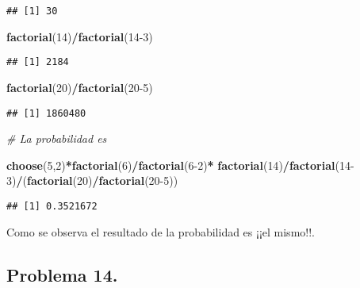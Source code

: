 \documentclass[
]{article}
\newenvironment{Shaded}{\begin{snugshade}}{\end{snugshade}}
\newcommand{\CommentTok}[1]{\textcolor[rgb]{0.56,0.35,0.01}{\textit{#1}}}
\newcommand{\DecValTok}[1]{\textcolor[rgb]{0.00,0.00,0.81}{#1}}
\newcommand{\KeywordTok}[1]{\textcolor[rgb]{0.13,0.29,0.53}{\textbf{#1}}}
\newcommand{\NormalTok}[1]{#1}
\newcommand{\OperatorTok}[1]{\textcolor[rgb]{0.81,0.36,0.00}{\textbf{#1}}}
\newcommand{\StringTok}[1]{\textcolor[rgb]{0.31,0.60,0.02}{#1}}
\begin{document}
\begin{verbatim}
## [1] 30
\end{verbatim}

\begin{Shaded}
\begin{Highlighting}[]
\KeywordTok{factorial}\NormalTok{(}\DecValTok{14}\NormalTok{)}\OperatorTok{/}\KeywordTok{factorial}\NormalTok{(}\DecValTok{14{-}3}\NormalTok{)}
\end{Highlighting}
\end{Shaded}

\begin{verbatim}
## [1] 2184
\end{verbatim}

\begin{Shaded}
\begin{Highlighting}[]
\KeywordTok{factorial}\NormalTok{(}\DecValTok{20}\NormalTok{)}\OperatorTok{/}\KeywordTok{factorial}\NormalTok{(}\DecValTok{20{-}5}\NormalTok{)}
\end{Highlighting}
\end{Shaded}

\begin{verbatim}
## [1] 1860480
\end{verbatim}

\begin{Shaded}
\begin{Highlighting}[]
\CommentTok{\# La probabilidad es }

\KeywordTok{choose}\NormalTok{(}\DecValTok{5}\NormalTok{,}\DecValTok{2}\NormalTok{)}\OperatorTok{*}\KeywordTok{factorial}\NormalTok{(}\DecValTok{6}\NormalTok{)}\OperatorTok{/}\KeywordTok{factorial}\NormalTok{(}\DecValTok{6{-}2}\NormalTok{)}\OperatorTok{*}
\StringTok{  }\KeywordTok{factorial}\NormalTok{(}\DecValTok{14}\NormalTok{)}\OperatorTok{/}\KeywordTok{factorial}\NormalTok{(}\DecValTok{14{-}3}\NormalTok{)}\OperatorTok{/}\NormalTok{(}\KeywordTok{factorial}\NormalTok{(}\DecValTok{20}\NormalTok{)}\OperatorTok{/}\KeywordTok{factorial}\NormalTok{(}\DecValTok{20{-}5}\NormalTok{))}
\end{Highlighting}
\end{Shaded}

\begin{verbatim}
## [1] 0.3521672
\end{verbatim}

Como se observa el resultado de la probabilidad es ¡¡el mismo!!.

\hypertarget{problema-14.}{%
\subsection{Problema 14.}\label{problema-14.}}
\end{document}
